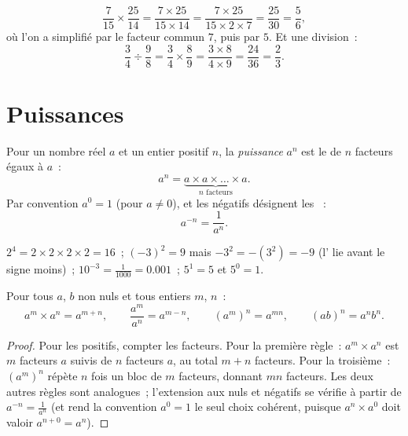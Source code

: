 \begin{example}\label{ex:g9:fractions:mult}
\[
\frac{7}{15} \times \frac{25}{14}
= \frac{7 \times 25}{15 \times 14}
= \frac{7 \times 25}{15 \times 2 \times 7}
= \frac{25}{30} = \frac56,
\]
où l'on a simplifié par le facteur commun $7$, puis par $5$. Et une
division~:
\[
\frac{3}{4} \div \frac{9}{8}
= \frac34 \times \frac89
= \frac{3 \times 8}{4 \times 9}
= \frac{24}{36} = \frac23 .
\]
\end{example}

\section{Puissances}

\begin{definition}[Puissance]\label{def:g9:fractions:power}
Pour un nombre réel $a$ et un entier positif $n$, la
\emph{puissance} $a^n$ est le  de $n$ facteurs
égaux à $a$~:
\[
a^n = \underbrace{a \times a \times \dots \times a}_{n \text{ facteurs}} .
\]
Par convention $a^0 = 1$ (pour $a \neq 0$), et les  négatifs
désignent les ~:
\[
a^{-n} = \frac{1}{a^n}.
\]
\end{definition}

\begin{example}
$2^4 = 2 \times 2 \times 2 \times 2 = 16$~; \quad
$(-3)^2 = 9$ mais $-3^2 = -(3^2) = -9$ (l' lie avant le signe
moins)~; \quad $10^{-3} = \frac{1}{1000} = 0.001$~; \quad
$5^1 = 5$ et $5^0 = 1$.
\end{example}

\begin{theorem}\label{thm:g9:fractions:rules}
Pour tous $a$, $b$ non nuls et tous entiers $m$, $n$~:
\[
a^m \times a^n = a^{m+n},
\qquad
\frac{a^m}{a^n} = a^{m-n},
\qquad
\left(a^m\right)^n = a^{mn},
\qquad
(ab)^n = a^n b^n .
\]
\end{theorem}

\begin{proof}
Pour les  positifs, compter les facteurs. Pour la première
règle~: $a^m \times a^n$ est $m$ facteurs $a$ suivis de $n$ facteurs
$a$, au total $m + n$ facteurs. Pour la troisième~:
$\left(a^m\right)^n$ répète $n$ fois un bloc de $m$ facteurs, donnant
$mn$ facteurs. Les deux autres règles sont analogues~; l'extension aux
 nuls et négatifs se vérifie à partir de
$a^{-n} = \frac{1}{a^n}$ (et rend la convention $a^0 = 1$ le seul choix
cohérent, puisque $a^n \times a^0$ doit valoir $a^{n+0} = a^n$).
\end{proof}

